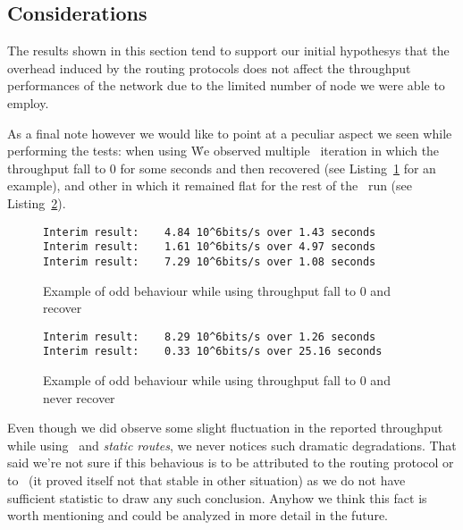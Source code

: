 \subsection{Considerations}
    The results shown in this section tend to support our initial
    hypothesys that the overhead induced by the routing protocols does
    not affect the throughput performances of the network due to the
    limited number of node we were able to employ.

    As a final note however we would like to point at a peculiar
    aspect we seen while performing the tests: when using \olsr\. We
    observed multiple \netperf\ iteration in which the throughput fall
    to 0 for some seconds and then recovered
    (see Listing~\ref{lst:netperf-olsr-recover} for an example), and
    other in which it remained flat for the rest of the \netperf\ run
    (see Listing~\ref{lst:netperf-olsr-zero}).

\begin{figure}[bthp]
\begin{lstlisting}
Interim result:    4.84 10^6bits/s over 1.43 seconds
Interim result:    1.61 10^6bits/s over 4.97 seconds
Interim result:    7.29 10^6bits/s over 1.08 seconds
\end{lstlisting}
\caption{Example of odd behaviour while using \olsr\: throughput fall
  to 0 and recover}
\label{lst:netperf-olsr-recover}
\end{figure}

\begin{figure}[bthp]
\begin{lstlisting}
Interim result:    8.29 10^6bits/s over 1.26 seconds
Interim result:    0.33 10^6bits/s over 25.16 seconds
\end{lstlisting}
\caption{Example of odd behaviour while using \olsr\: throughput fall
  to 0 and never recover}
\label{lst:netperf-olsr-zero}
\end{figure}

Even though we did observe some slight fluctuation in the reported
throughput while using \batman\ and \emph{static routes}, we never
notices such dramatic degradations. That said we're not sure if this
behavious is to be attributed to the routing protocol or to \netperf\
(it proved itself not that stable in other situation) as we do not
have sufficient statistic to draw any such conclusion. Anyhow we think
this fact is worth mentioning and could be analyzed in more detail in
the future.